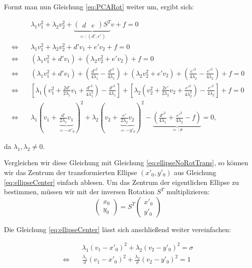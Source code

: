 Formt man nun Gleichung \ref{eq:PCARot} weiter um, ergibt sich:

\begin{equation}\label{eq:ellipseCenter}
\begin{aligned}
&\lambda_1v_1^2 + \lambda_2v_2^2 + \underbrace{\begin{pmatrix}d & e\end{pmatrix}S^T}_{=:(d', e')}v + f = 0 \\
\Leftrightarrow\quad &\lambda_1v_1^2 + \lambda_2v_2^2 + d'v_1 + e'v_2 + f = 0 \\
\Leftrightarrow\quad &(\lambda_1v_1^2 + d'v_1)+ (\lambda_2v_2^2 + e'v_2) + f = 0\\
\Leftrightarrow\quad &(\lambda_1v_1^2 + d'v_1) + (\frac{d'^2}{4\lambda_1} - \frac{d'^2}{4\lambda_1}) + (\lambda_2v_2^2 + e'v_2) + (\frac{e'^2}{4\lambda_2} - \frac{e'^2}{4\lambda_2}) + f = 0 \\
\Leftrightarrow\quad &\left[\lambda_1\left(v_1^2 + \frac{2d'}{2\lambda_1}v_1 + \frac{d'^2}{4\lambda_1^2}\right) - \frac{d'^2}{4\lambda_1}\right] +\left[\lambda_2\left(v_2^2 + \frac{2e'}{2\lambda_2}v_2 + \frac{e'^2}{4\lambda_2^2}\right) - \frac{e'^2}{4\lambda_2}\right] + f = 0 \\
\Leftrightarrow\quad &\lambda_1(v_1 + \underbrace{\frac{d'}{2\lambda_1}v_1}_{ = -x'_0})^2 +\lambda_2(v_2 + \underbrace{\frac{e'}{2\lambda_2}v_2}_{ = -y'_0})^2 - \underbrace{(\frac{d'^2}{4\lambda_1} + \frac{e'^2}{4\lambda_2} - f)}_{=:\sigma} = 0,
\end{aligned}
\end{equation}

da $\lambda_1, \lambda_2 \neq 0$.

Vergleichen wir diese Gleichung mit Gleichung \ref{eq:ellipseNoRotTrans}, so können wir das Zentrum der transformierten Ellipse $(x'_0, y'_0)$ aus Gleichung \ref{eq:ellipseCenter} einfach ablesen. Um das Zentrum der eigentlichen Ellipse zu bestimmen, müssen wir mit der inversen Rotation $S^T$ multiplizieren:
\[
\begin{pmatrix} x_0 \\ y_0 \end{pmatrix} = S^T \begin{pmatrix} x'_0 \\ y'_0 \end{pmatrix}
\]

Die Gleichung \ref{eq:ellipseCenter} lässt sich anschließend weiter vereinfachen:

\begin{equation} \label{eq:PCAKoeff}
\begin{aligned}
&\lambda_1(v_1 -x'_0)^2 +\lambda_2(v_2 -y'_0)^2 = \sigma \\
\Leftrightarrow\quad & \frac{\lambda_1}{\sigma}(v_1 -x'_0)^2 +\frac{\lambda_2}{\sigma}(v_2 -y'_0)^2  =1
\end{aligned}
\end{equation}

